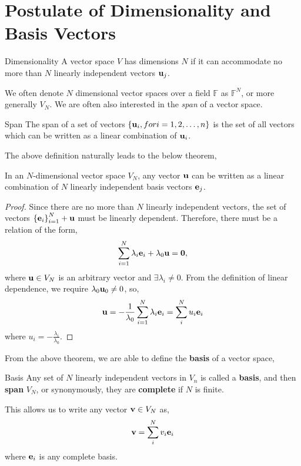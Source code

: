 \documentclass{book}
\begin{document}
\section{Postulate of Dimensionality and Basis Vectors}
\begin{Definitions}{Dimensionality}{}
	A vector space $V$ has dimensions $N$ if it can accommodate no more than $N$ linearly independent vectors $\vb{u}_j$.
\end{Definitions}
We often denote $N$ dimensional vector spaces over a field $\mathbb{F}$ as $\mathbb{F}^N$, or more generally $V_N$. We are often also interested in the \textit{span} of a vector space.
\begin{Definitions}{Span}{}
	The span of a set of vectors $\left\{\vb{u}_i, for i=1,2,\ldots,n\right\}$ is the set of all vectors which can be written as a linear combination of $\vb{u}_i$.
\end{Definitions}
The above definition naturally leads to the below theorem,
\begin{Theorems}{}{}
	In an $N$-dimensional vector space $V_N$, any vector $\vb{u}$ can be written as a linear combination of $N$ linearly independent basis vectors $\vb{e}_j$.
\end{Theorems}
\begin{proof}
	Since there are no more than $N$ linearly independent vectors, the set of vectors $\left\{\vb{e}_i\right\}_{i=1}^{N} + \vb{u}$ must be linearly dependent. Therefore, there must be a relation of the form,
	\begin{equation}
		\sum_{i=1}^{N} \lambda_i\vb{e}_i + \lambda_0\vb{u} = \vb{0},
	\end{equation}
	where $\vb{u} \in V_N$ is an arbitrary vector and $\exists \lambda_i \neq 0$. From the definition of linear dependence, we require $\lambda_0 \vb{u}_0 \neq 0$, so,
	\begin{equation}
		\vb{u} = - \frac{1}{\lambda_0}\sum_{i=1}^{N}\lambda_i\vb{e}_i = \sum_i^Nu_i\vb{e}_i
	\end{equation}
	where $u_i = -\frac{\lambda_i}{\lambda_0}$.
\end{proof}
From the above theorem, we are able to define the \textbf{basis} of a vector space,
\begin{Definitions}{Basis}{}
	Any set of $N$ linearly independent vectors in $V_n$ is called a \textbf{basis}, and then \textbf{span} $V_N$, or synonymously, they are \textbf{complete} if $N$ is finite.
\end{Definitions}
This allows us to write any vector $\vb{v} \in V_N$ as,
\begin{equation}
	\vb{v} = \sum_i^Nv_i\vb{e}_i
\end{equation}
where $\vb{e}_i$ is any complete basis.
\end{document}
